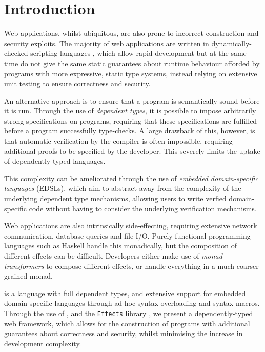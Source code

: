 \documentclass[preprint]{sigplanconf}
\begin{document}



\section{Introduction}
Web applications, whilst ubiquitous, are also prone to incorrect construction and security exploits. The majority of web applications are written in dynamically-checked scripting languages \cite{}, which allow rapid development but at the same time do not give the same static guarantees about runtime behaviour afforded by programs with more expressive, static type systems, instead relying on extensive unit testing to ensure correctness and security. 

An alternative approach is to ensure that a program is semantically sound before it is run. Through the use of \textit{dependent types}, it is possible to impose arbitrarily strong specifications on programs, requiring that these specifications are fulfilled before a program successfully type-checks. A large drawback of this, however, is that automatic verification by the compiler is often impossible, requiring additional proofs to be specified by the developer. This severely limits the uptake of dependently-typed languages.

This complexity can be ameliorated through the use of \textit{embedded domain-specific languages} (EDSLs), which aim to abstract away from the complexity of the underlying dependent type mechanisms, allowing users to write verfied domain-specific code without having to consider the underlying verification mechanisms.   %

Web applications are also intrinsically side-effecting, requiring extensive network communication, database queries and file I/O. Purely functional programming languages such as Haskell \cite{haskell} handle this monadically, but the composition of different effects can be difficult. Developers either make use of \textit{monad transformers} to compose different effects, or handle everything in a much coarser-grained monad.

\idris{} \cite{} is a language with full dependent types, and extensive support for embedded domain-specific languages through ad-hoc syntax overloading and syntax macros. Through the use of \idris{}, and the \texttt{Effects} library \cite{}, we present a dependently-typed web framework, which allows for the construction of programs with additional guarantees about correctness and security, whilst minimising the increase in development complexity. 
\end{document}
